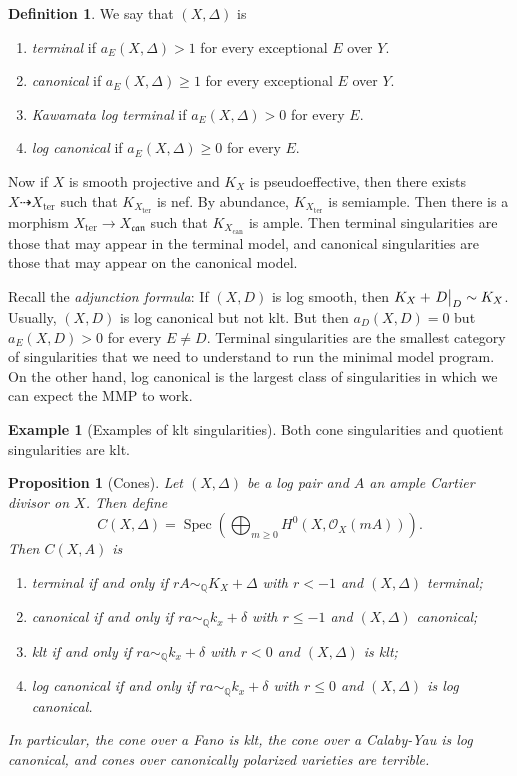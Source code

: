 \documentclass[leqno, openany]{memoir}
\newtheorem{prop}[thm]{Proposition}
\theoremstyle{definition}
\newtheorem{defn}[thm]{Definition}
\newtheorem{exm}[thm]{Example}
\theoremstyle{remark}
\theoremstyle{plain}
\theoremstyle{definition}
\theoremstyle{remark}
\newcommand{\Q}{\mathbb{Q}}
\newcommand{\mc}[1]{\mathcal{#1}}
\newcommand{\mf}[1]{\mathfrak{#1}}
\newcommand{\mr}[1]{\mathrm{#1}}
\DeclareMathOperator{\Spec}{Spec}
\begin{document}
\begin{defn}
    We say that $(X, \Delta)$ is 
    \begin{enumerate}
        \item \textit{terminal} if $a_E(X, \Delta) > 1$ for every exceptional $E$ over $Y$.
        \item \textit{canonical} if $a_E(X, \Delta) \geq 1$ for every exceptional $E$ over $Y$.
        \item \textit{Kawamata log terminal} if $a_E(X, \Delta) > 0$ for every $E$.
        \item \textit{log canonical} if $a_E(X, \Delta) \geq 0$ for every $E$.
    \end{enumerate}
\end{defn}

Now if $X$ is smooth projective and $K_X$ is pseudoeffective, then there exists $X \dashrightarrow X_{\mr{ter}}$ such that $K_{X_{\mr{ter}}}$ is nef. By abundance, $K_{X_{\mr{ter}}}$ is semiample. Then there is a morphism $X_{\mr{ter}} \to X_{\mf{can}}$ such that $K_{X_{\mr{can}}}$ is ample. Then terminal singularities are those that may appear in the terminal model, and canonical singularities are those that may appear on the canonical model.

Recall the \textit{adjunction formula}: If $(X, D)$ is log smooth, then $K_X + \eval{D}_D \sim K_X$. Usually, $(X,D)$ is log canonical but not klt. But then $a_D(X,D) = 0$ but $a_E(X, D) > 0$ for every $E \neq D$. Terminal singularities are the smallest category of singularities that we need to understand to run the minimal model program. On the other hand, log canonical is the largest class of singularities in which we can expect the MMP to work.

\begin{exm}[Examples of klt singularities]
    Both cone singularities and quotient singularities are klt. 
\end{exm}

\begin{prop}[Cones]
    Let $(X, \Delta)$ be a log pair and $A$ an ample Cartier divisor on $X$. Then define
    \[ C(X, \Delta) = \Spec (\bigoplus_{m \geq 0} H^0(X, \mc{O}_X(mA))). \]
    Then $C(X, A)$ is 
    \begin{enumerate}
        \item terminal if and only if $rA \sim_{\Q} K_X + \Delta$ with $r < -1$ and $(X, \Delta)$ terminal;
        \item canonical if and only if $ra \sim_{\Q} k_x + \delta$ with $r \leq -1$ and $(X, \Delta)$ canonical;
        \item klt if and only if $ra \sim_{\Q} k_x + \delta$ with $r < 0$ and $(X, \Delta)$ is klt;
        \item log canonical if and only if $ra \sim_{\Q} k_x + \delta$ with $r \leq 0$ and $(X, \Delta)$ is log canonical.
    \end{enumerate}
    In particular, the cone over a Fano is klt, the cone over a Calaby-Yau is log canonical, and cones over canonically polarized varieties are terrible.
\end{prop}
\end{document}
